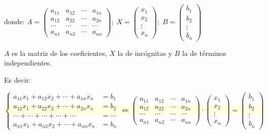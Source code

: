 donde:
$A=\left( \begin{matrix}  a_{11}&a_{12}& \cdots &a_{1n} \\
a_{12} &a_{22} &\cdots &a_{2n} \\
\cdots & \cdots & \cdots & \cdots  \\
a_{n1} &a_{n2} &\cdots &a_{nn}    \end{matrix} \right); \; X=\left( \begin{matrix} x_1\\x_2\\ \vdots \\x_n \end{matrix} \right); \; B=\left( \begin{matrix} b_1\\b_2\\ \vdots \\b_n \end{matrix} \right)$

$A$ es la matriz de los coeficientes, $X$ la de incógnitas y $B$ la de términos independientes.

Es decir: 

\noindent \colorbox{LightYellow}{\scriptsize{$\boxed{\begin{cases} a_{11}x_1+a_{12}x_2 + \cdots + a_{1n}x_n &=b_1 \\
a_{12}x_1+a_{22}x_2 + \cdots + a_{2n}x_n &=b_2 \\
\cdots + \cdots + \cdots + \cdots + \cdots  &=\cdots \\
a_{n1}x_1+a_{n2}x_2+\cdots +a_{nn}x_n &=b_n  \end{cases}  \Leftrightarrow 
\left( \begin{matrix}  a_{11}&a_{12}& \cdots &a_{1n} \\
a_{12} &a_{22} &\cdots &a_{2n} \\
\cdots & \cdots & \cdots & \cdots  \\
a_{n1} &a_{n2} &\cdots &a_{nn}    \end{matrix} \right) \cdot \left( \begin{matrix} x_1\\x_2\\ \vdots \\x_n \end{matrix} \right)=\left( \begin{matrix} b_1\\b_2\\ \vdots \\b_n \end{matrix} \right)}$}}


